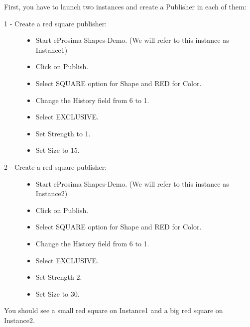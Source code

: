 \documentclass[letterpaper,10pt,english]{sphinxmanual}
\begin{document}

First, you have to launch two instances and create a Publisher in each of them:
\begin{description}
\item[{1 - Create a red square publisher:}] \leavevmode\begin{itemize}
\item {} 
Start eProsima Shapes-Demo. (We will refer to this instance as Instance1)

\item {} 
Click on Publish.

\item {} 
Select SQUARE option for Shape and RED for Color.

\item {} 
Change the History field from 6 to 1.

\item {} 
Select EXCLUSIVE.

\item {} 
Set Strength to 1.

\item {} 
Set Size to 15.

\end{itemize}

\item[{2 - Create a red square publisher:}] \leavevmode\begin{itemize}
\item {} 
Start eProsima Shapes-Demo. (We will refer to this instance as Instance2)

\item {} 
Click on Publish.

\item {} 
Select SQUARE option for Shape and RED for Color.

\item {} 
Change the History field from 6 to 1.

\item {} 
Select EXCLUSIVE.

\item {} 
Set Strength 2.

\item {} 
Set Size to 30.

\end{itemize}

\end{description}

You should see a small red square on Instance1 and a big red square on Instance2.
\end{document}
